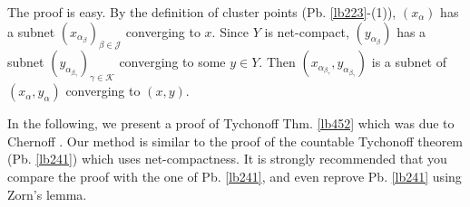 \documentclass[12pt,b5paper,notitlepage]{article}
\theoremstyle{definition}
\theoremstyle{plain}
\newcommand{\scr}{\mathscr}
\numberwithin{equation}{section}
\begin{document}
The proof is easy. By the definition of cluster points (Pb. \ref{lb223}-(1)), $(x_\alpha)$ has a subnet $(x_{\alpha_\beta})_{\beta\in\scr J}$ converging to $x$. Since $Y$ is net-compact, $(y_{\alpha_\beta})$ has a subnet $(y_{\alpha_{\beta_\gamma}})_{\gamma\in\scr K}$ converging to some $y\in Y$. Then $(x_{\alpha_{\beta_\gamma}},y_{\alpha_{\beta_\gamma}})$ is a subnet of $(x_\alpha,y_\alpha)$ converging to $(x,y)$.



In the following, we present a proof of Tychonoff Thm. \ref{lb452} which was due to Chernoff \cite{Che92}. Our method is similar to the proof of the countable Tychonoff theorem (Pb. \ref{lb241}) which uses net-compactness. It is strongly recommended that you compare the proof with the one of Pb. \ref{lb241}, and even reprove Pb. \ref{lb241} using Zorn's lemma.
\end{document}
